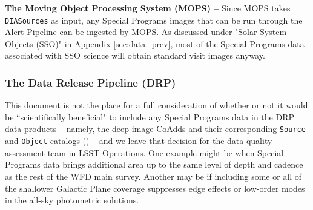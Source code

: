 \documentclass[DM,lsstdoc,toc]{lsstdoc}
\begin{document}


{\bf The Moving Object Processing System (MOPS) -- } Since MOPS takes \texttt{DIASources} as input, any Special Programs images that can be run through the Alert Pipeline can be ingested by MOPS. As discussed under "Solar System Objects (SSO)" in Appendix \ref{sec:data_prev}, most of the Special Programs data associated with SSO science will obtain standard visit images anyway. %

\subsubsection{The Data Release Pipeline (DRP)}\label{ssec:dmplans_drp}

This document is not the place for a full consideration of whether or not it would be ``scientifically beneficial" to include any Special Programs data in the DRP data products -- namely, the deep image CoAdds and their corresponding {\tt Source} and {\tt Object} catalogs () -- and we leave that decision for the data quality assessment team in LSST Operations. One example might be when Special Programs data brings additional area up to the same level of depth and cadence as the rest of the WFD main survey. Another may be if including some or all of the shallower Galactic Plane coverage suppresses edge effects or low-order modes in the all-sky photometric solutions.
\end{document}
